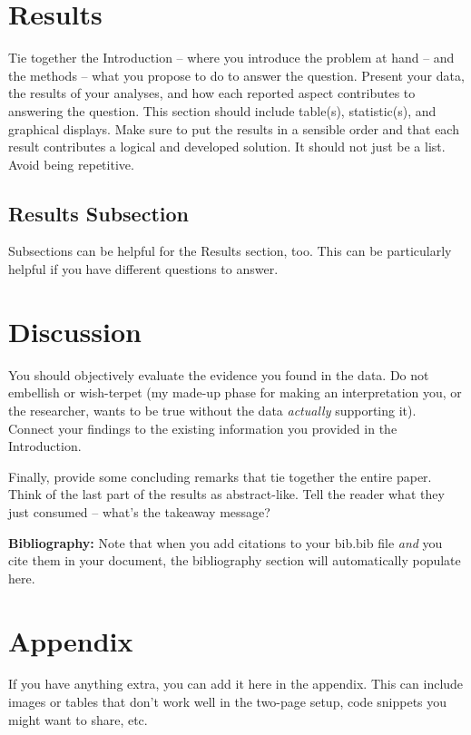 \documentclass{article}\usepackage[]{graphicx}\usepackage[]{xcolor}
\begin{document}
\begin{multicols}{2}
\section{Results}
Tie together the Introduction -- where you introduce the problem at hand -- and the methods --  what you propose to do to answer the question. Present your data, the results of your analyses, and how each reported aspect contributes to answering the question. This section should include table(s), statistic(s), and graphical displays. Make sure to put the results in a sensible order and that each result contributes a logical and developed solution. It should not just be a list. Avoid being repetitive. 

\subsection{Results Subsection}
Subsections can be helpful for the Results section, too. This can be particularly helpful if you have different questions to answer. 


\section{Discussion}
 You should objectively evaluate the evidence you found in the data. Do not embellish or wish-terpet (my made-up phase for making an interpretation you, or the researcher, wants to be true without the data \emph{actually} supporting it). Connect your findings to the existing information you provided in the Introduction.

Finally, provide some concluding remarks that tie together the entire paper. Think of the last part of the results as abstract-like. Tell the reader what they just consumed -- what's the takeaway message?

\vspace{2em}

\noindent\textbf{Bibliography:} Note that when you add citations to your bib.bib file \emph{and}
you cite them in your document, the bibliography section will automatically populate here.

\begin{tiny}

\end{tiny}
\end{multicols}

\newpage
\onecolumn
\section{Appendix}

If you have anything extra, you can add it here in the appendix. This can include images or tables that don't work well in the two-page setup, code snippets you might want to share, etc.
\end{document}
